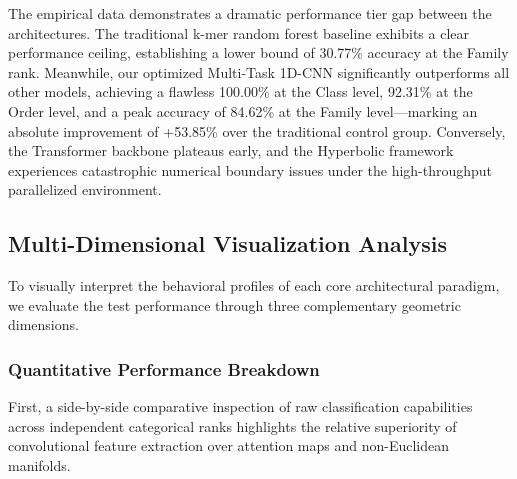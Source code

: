 \documentclass[11pt,a4paper]{article}
\begin{document}
\begin{table}[htbp]
\centering
\caption{Unified Genome-Level Accuracy Metrics Across Taxonomic Hierarchies}
\label{tab:ablation-results}
\end{table}

The empirical data demonstrates a dramatic performance tier gap between the architectures. The traditional k-mer random forest baseline exhibits a clear performance ceiling, establishing a lower bound of 30.77\% accuracy at the Family rank. Meanwhile, our optimized Multi-Task 1D-CNN significantly outperforms all other models, achieving a flawless 100.00\% at the Class level, 92.31\% at the Order level, and a peak accuracy of 84.62\% at the Family level—marking an absolute improvement of +53.85\% over the traditional control group. Conversely, the Transformer backbone plateaus early, and the Hyperbolic framework experiences catastrophic numerical boundary issues under the high-throughput parallelized environment.

\subsection{Multi-Dimensional Visualization Analysis}
To visually interpret the behavioral profiles of each core architectural paradigm, we evaluate the test performance through three complementary geometric dimensions.

\subsubsection{Quantitative Performance Breakdown}
First, a side-by-side comparative inspection of raw classification capabilities across independent categorical ranks highlights the relative superiority of convolutional feature extraction over attention maps and non-Euclidean manifolds.
\end{document}
